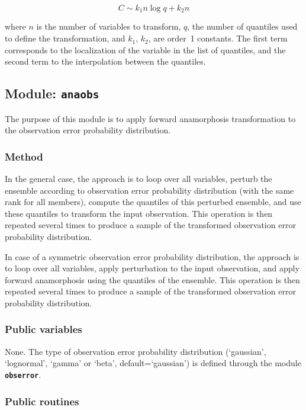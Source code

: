\documentclass[11pt]{article}
\begin{document}
\begin{equation}
C \sim k_1 n  \log q + k_2 n
\end{equation}

\noindent
where $n$ is the number of variables to transform,
$q$, the number of quantiles used to define the transformation, and
$k_1,\,k_2$, are order~1 constants.
The first term corresponds to the localization of the variable in the list of quantiles,
and the second term to the interpolation between the quantiles.

\subsection{Module: {\tt\bf anaobs}}

The purpose of this module is to apply forward
anamorphosis transformation to the observation
error probability distribution.

\subsubsection*{Method}

In the general case, the approach is to loop over all variables,
perturb the ensemble according to observation error probability distribution
(with the same rank for all members),
compute the quantiles of this perturbed ensemble,
and use these quantiles to transform the input observation.
This operation is then repeated several times
to produce a sample of the transformed observation error probability distribution.

In case of a symmetric observation error probability distribution,
the approach is to loop over all variables,
apply perturbation to the input observation,
and apply forward anamorphosis using the quantiles of the ensemble.
This operation is then repeated several times
to produce a sample of the transformed observation error probability distribution.

\subsubsection*{Public variables}

None. The type of observation error probability distribution
(`gaussian', `lognormal', `gamma' or `beta', default=`gaussian')
is defined through the module {\bf\tt obserror}.

\subsubsection*{Public routines}
\end{document}
